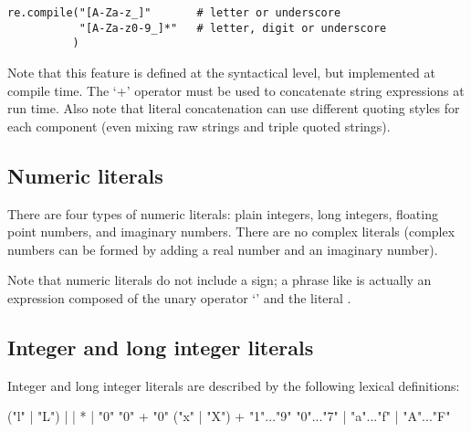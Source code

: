 \begin{verbatim}
re.compile("[A-Za-z_]"       # letter or underscore
           "[A-Za-z0-9_]*"   # letter, digit or underscore
          )
\end{verbatim}

Note that this feature is defined at the syntactical level, but
implemented at compile time.  The `+' operator must be used to
concatenate string expressions at run time.  Also note that literal
concatenation can use different quoting styles for each component
(even mixing raw strings and triple quoted strings).


\subsection{Numeric literals\label{numbers}}

There are four types of numeric literals: plain integers, long
integers, floating point numbers, and imaginary numbers.  There are no
complex literals (complex numbers can be formed by adding a real
number and an imaginary number).

Note that numeric literals do not include a sign; a phrase like
 is actually an expression composed of the unary operator
`\code{-}' and the literal .


\subsection{Integer and long integer literals\label{integers}}

Integer and long integer literals are described by the following
lexical definitions:

\begin{productionlist}
             { ("l" | "L")}
             { |  | }
             { * | "0"}
             {"0" +}
             {"0" ("x" | "X") +}
             {"1"..."9"}
             {"0"..."7"}
             { | "a"..."f" | "A"..."F"}
\end{productionlist}

